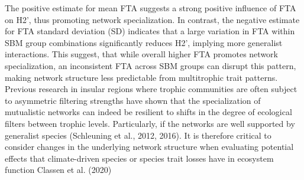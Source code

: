 \documentclass[
]{agujournal2019}
\begin{document}
The positive estimate for mean FTA suggests a strong positive influence
of FTA on H2', thus promoting network specialization. In contrast, the
negative estimate for FTA standard deviation (SD) indicates that a large
variation in FTA within SBM group combinations significantly reduces
H2', implying more generalist interactions. This suggest, that while
overall higher FTA promotes network specialization, an inconsistent FTA
across SBM groups can disrupt this pattern, making network structure
less predictable from multitrophic trait patterns. Previous research in
insular regions where trophic communities are often subject to
asymmetric filtering strengths have shown that the specialization of
mutualistic networks can indeed be resilient to shifts in the degree of
ecological filters between trophic levels. Particularly, if the networks
are well supported by generalist species (Schleuning et al., 2012,
2016). It is therefore critical to consider changes in the underlying
network structure when evaluating potential effects that climate-driven
species or species trait losses have in ecosystem function Classen et
al. (2020)
\end{document}
